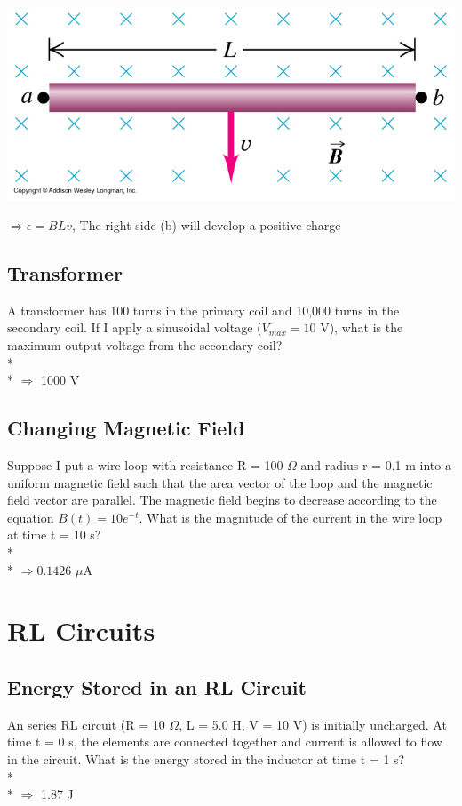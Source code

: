 \documentclass[11pt]{article}
\begin{document}
\begin{center}
\includegraphics[scale=0.25]{Images/bar_in_magnetic_field.png}
\end{center}

$\Rightarrow \epsilon = BLv$, The right side (b) will develop a positive charge

\subsection{Transformer}
A transformer has 100 turns in the primary coil and 10,000 turns in the secondary coil.  If I apply a sinusoidal voltage ($V_{max} = 10$ V), what is the maximum output voltage from the secondary coil? \\* \\*
$\Rightarrow$ 1000 V

\subsection{Changing Magnetic Field}
Suppose I put a wire loop with resistance R = 100 $\Omega$ and radius r = 0.1 m into a uniform magnetic field such that the area vector of the loop and the magnetic field vector are parallel.  The magnetic field begins to decrease according to the equation $B(t) = 10e^{-t}$.  What is the magnitude of the current in the wire loop at time t = 10 s? \\* \\*
$\Rightarrow 0.1426$ $\mu$A



\pagebreak
\section{RL Circuits}
\vspace{10pt}

\subsection{Energy Stored in an RL Circuit}
An series RL circuit (R = 10 $\Omega$, L = 5.0 H, V = 10 V) is initially uncharged.  At time t = 0 s, the elements are connected together and current is allowed to flow in the circuit.  What is the energy stored in the inductor at time t = 1 s? \\* \\*
$\Rightarrow$ 1.87 J
\end{document}
